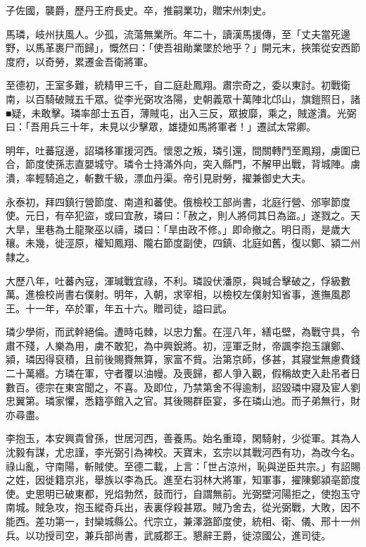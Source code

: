\begin{pinyinscope}
 子佐國，襲爵，歷丹王府長史。卒，推嗣業功，贈宋州刺史。



 馬璘，岐州扶風人。少孤，流蕩無業所。年二十，讀漢馬援傳，至「丈夫當死邊野，以馬革裹尸而歸」，慨然曰：「使吾祖勛業墜於地乎？」開元末，挾策從安西節度府，以奇勞，累遷金吾衛將軍。



 至德初，王室多難，統精甲三千，自二庭赴鳳翔。肅宗奇之，委以東討。初戰衛南，以百騎破賊五千眾。從李光弼攻洛陽，史朝義眾十萬陣北邙山，旗鎧照日，諸■疑，未敢擊。璘率部士五百，薄賊屯，出入三反，眾披靡，乘之，賊遂潰。光弼曰：「吾用兵三十年，未見以少擊眾，雄捷如馬將軍者！」遷試太常卿。



 明年，吐蕃寇邊，詔璘移軍援河西。懷恩之叛，璘引還，間關轉鬥至鳳翔，虜圍已合，節度使孫志直嬰城守。璘令士持滿外向，突入縣門，不解甲出戰，背城陣。虜潰，率輕騎追之，斬數千級，漂血丹渠。帝引見尉勞，擢兼御史大夫。



 永泰初，拜四鎮行營節度、南道和蕃使。俄檢校工部尚書，北庭行營、邠寧節度使。元日，有卒犯盜，或曰宜赦，璘曰：「赦之，則人將伺其日為盜。」遂戮之。天大旱，里巷為土龍聚巫以禱，璘曰：「旱由政不修。」即命撤之。明日雨，是歲大穰。未幾，徙涇原，權知鳳翔、隴右節度副使，四鎮、北庭如舊，復以鄭、潁二州隸之。



 大歷八年，吐蕃內寇，渾瑊戰宜祿，不利。璘設伏潘原，與瑊合擊破之，俘級數萬。進檢校尚書右僕射。明年，入朝，求宰相，以檢校左僕射知省事，進撫風郡王。十一年，卒於軍，年五十六。贈司徒，謚曰武。



 璘少學術，而武幹絕倫。遭時屯棘，以忠力奮。在涇八年，繕屯壁，為戰守具，令肅不殘，人樂為用，虜不敢犯，為中興銳將。初，涇軍乏財，帝諷李抱玉讓鄭、潁，璘因得裒積，且前後賜賚無算，家富不貲。治第京師，侈甚，其寢堂無慮費錢二十萬緡。方璘在軍，守者覆以油幔。及喪歸，都人爭入觀，假稱故吏入赴吊者日數百。德宗在東宮聞之，不喜。及即位，乃禁第舍不得逾制，詔毀璘中寢及宦人劉忠翼第。璘家懼，悉籍亭館入之官。其後賜群臣宴，多在璘山池。而子弟無行，財亦尋盡。



 李抱玉，本安興貴曾孫，世居河西，善養馬。始名重璋，閑騎射，少從軍。其為人沈毅有謀，尤忠謹，李光弼引為裨校。天寶末，玄宗以其戰河西有功，為改今名。祿山亂，守南陽，斬賊使。至德二載，上言：「世占涼州，恥與逆臣共宗。」有詔賜之姓，因徙籍京兆，舉族以李為氏。進至右羽林大將軍，知軍事，擢陳鄭潁亳節度使。史思明已破東都，兇焰勃然，鼓而行，自謂無前。光弼壁河陽拒之，使抱玉守南城。賊急攻，抱玉縱奇兵出，表裏俘殺甚眾。賊乃舍去，從光弼戰，大敗，因不能西。差功第一，封欒城縣公。代宗立，兼澤潞節度使，統相、衛、儀、邢十一州兵。以功授司空，兼兵部尚書，武威郡王。懇辭王爵，徙涼國公，進司徒。




\end{pinyinscope}
